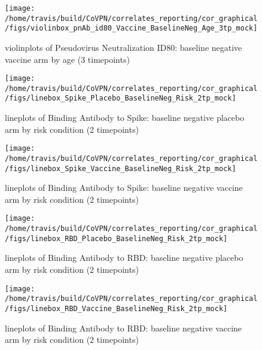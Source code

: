 \documentclass[]{book}
\theoremstyle{definition}
\theoremstyle{definition}
\theoremstyle{definition}
\newcommand{\1}{\mathbbm{1}}
\begin{document}
\clearpage
\begin{figure}[H]

{\centering \texttt{[image: /home/travis/build/CoVPN/correlates\_reporting/cor\_graphical/figs/violinbox\_pnAb\_id80\_Vaccine\_BaselineNeg\_Age\_3tp\_mock]} 

}

\caption{violinplots of Pseudovirus Neutralization ID80: baseline negative vaccine arm by age (3 timepoints)}\label{fig:unnamed-chunk-90}
\end{figure}

\clearpage
\begin{figure}[H]

{\centering \texttt{[image: /home/travis/build/CoVPN/correlates\_reporting/cor\_graphical/figs/linebox\_Spike\_Placebo\_BaselineNeg\_Risk\_2tp\_mock]} 

}

\caption{lineplots of Binding Antibody to Spike: baseline negative placebo arm by risk condition (2 timepoints)}\label{fig:unnamed-chunk-91}
\end{figure}

\clearpage
\begin{figure}[H]

{\centering \texttt{[image: /home/travis/build/CoVPN/correlates\_reporting/cor\_graphical/figs/linebox\_Spike\_Vaccine\_BaselineNeg\_Risk\_2tp\_mock]} 

}

\caption{lineplots of Binding Antibody to Spike: baseline negative vaccine arm by risk condition (2 timepoints)}\label{fig:unnamed-chunk-92}
\end{figure}

\clearpage
\begin{figure}[H]

{\centering \texttt{[image: /home/travis/build/CoVPN/correlates\_reporting/cor\_graphical/figs/linebox\_RBD\_Placebo\_BaselineNeg\_Risk\_2tp\_mock]} 

}

\caption{lineplots of Binding Antibody to RBD: baseline negative placebo arm by risk condition (2 timepoints)}\label{fig:unnamed-chunk-93}
\end{figure}

\clearpage
\begin{figure}[H]

{\centering \texttt{[image: /home/travis/build/CoVPN/correlates\_reporting/cor\_graphical/figs/linebox\_RBD\_Vaccine\_BaselineNeg\_Risk\_2tp\_mock]} 

}

\caption{lineplots of Binding Antibody to RBD: baseline negative vaccine arm by risk condition (2 timepoints)}\label{fig:unnamed-chunk-94}
\end{figure}
\end{document}
